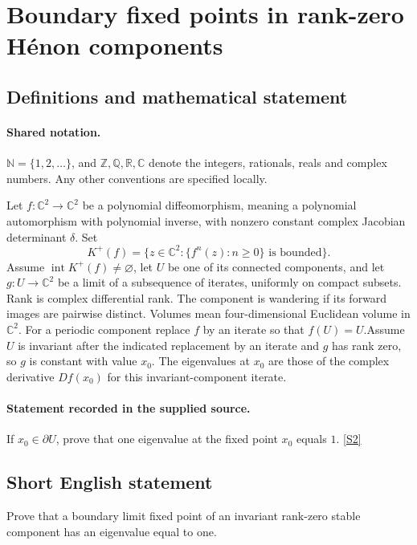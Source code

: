 \documentclass[11pt]{article}
\newcommand{\sref}[2]{\hyperlink{source:#1:#2}{[S#2]}}
\begin{document}
\section{Boundary fixed points in rank-zero Hénon components}\label{statement}

\subsection{Definitions and mathematical statement}

\paragraph{Shared notation.}$\mathbb N=\{1,2,\ldots\}$, and $\mathbb Z,\mathbb Q,\mathbb R,\mathbb C$ denote the integers, rationals, reals and complex numbers. Any other conventions are specified locally.


Let $f:\mathbb C^2\to\mathbb C^2$ be a polynomial diffeomorphism, meaning a polynomial automorphism with polynomial inverse, with nonzero constant complex Jacobian determinant $\delta$. Set
\[K^+(f)=\{z\in\mathbb C^2:\{f^n(z):n\geq0\}\text{ is bounded}\}.\]
Assume $\operatorname{int}K^+(f)\ne\varnothing$, let $U$ be one of its connected components, and let $g:U\to\mathbb C^2$ be a limit of a subsequence of iterates, uniformly on compact subsets. Rank is complex differential rank. The component is wandering if its forward images are pairwise distinct. Volumes mean four-dimensional Euclidean volume in $\mathbb C^2$. For a periodic component replace $f$ by an iterate so that $f(U)=U$.Assume $U$ is invariant after the indicated replacement by an iterate and $g$ has rank zero, so $g$ is constant with value $x_0$. The eigenvalues at $x_0$ are those of the complex derivative $Df(x_0)$ for this invariant-component iterate.
\paragraph{Statement recorded in the supplied source.}
If $x_0\in\partial U$, prove that one eigenvalue at the fixed point $x_0$ equals $1$. \sref{statement}{2}
\subsection{Short English statement}
Prove that a boundary limit fixed point of an invariant rank-zero stable component has an eigenvalue equal to one.
\end{document}
